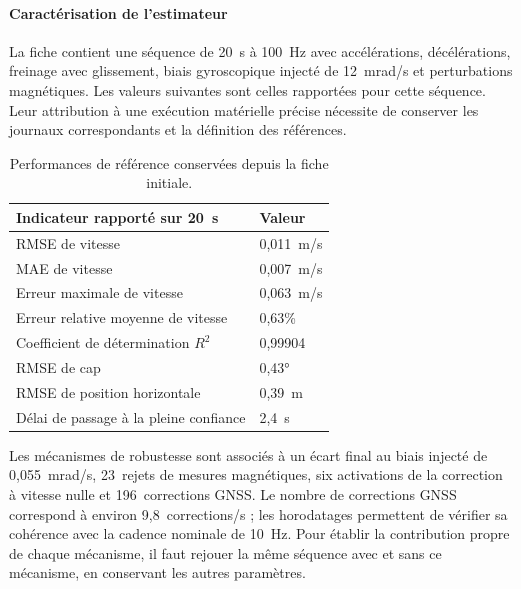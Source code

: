 \paragraph{Caractérisation de l'estimateur}
La fiche contient une séquence de 20~s à 100~Hz avec accélérations, décélérations, freinage avec glissement, biais gyroscopique injecté de 12~mrad/s et perturbations magnétiques. Les valeurs suivantes sont celles rapportées pour cette séquence. Leur attribution à une exécution matérielle précise nécessite de conserver les journaux correspondants et la définition des références.


\begin{table}[!htbp]\centering\small
\begin{tabularx}{\linewidth}{|Y|L{3.0cm}|}\hline
{}\textbf{Indicateur rapporté sur 20~s} & \textbf{Valeur}\\\hline
RMSE de vitesse & 0,011~m/s\\\hline
MAE de vitesse & 0,007~m/s\\\hline
Erreur maximale de vitesse & 0,063~m/s\\\hline
Erreur relative moyenne de vitesse & 0,63\%\\\hline
Coefficient de détermination $R^2$ & 0,99904\\\hline
RMSE de cap & 0,43°\\\hline
RMSE de position horizontale & 0,39~m\\\hline
Délai de passage à la pleine confiance & 2,4~s\\\hline
\end{tabularx}
\caption{Performances de référence conservées depuis la fiche initiale.}
\end{table}

Les mécanismes de robustesse sont associés à un écart final au biais injecté de 0,055~mrad/s, 23~rejets de mesures magnétiques, six activations de la correction à vitesse nulle et 196~corrections GNSS. Le nombre de corrections GNSS correspond à environ 9,8~corrections/s ; les horodatages permettent de vérifier sa cohérence avec la cadence nominale de 10~Hz. Pour établir la contribution propre de chaque mécanisme, il faut rejouer la même séquence avec et sans ce mécanisme, en conservant les autres paramètres.
\FloatBarrier

